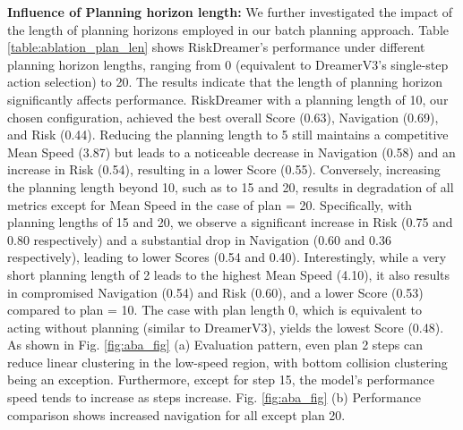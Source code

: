 \textbf{Influence of Planning horizon length:}
We further investigated the impact of the length of planning horizons employed in our batch planning approach. Table \ref{table:ablation_plan_len} shows RiskDreamer's performance under different planning horizon lengths, ranging from 0 (equivalent to DreamerV3's single-step action selection) to 20. The results indicate that the length of planning horizon significantly affects performance. RiskDreamer with a planning length of 10, our chosen configuration, achieved the best overall Score (0.63), Navigation (0.69), and Risk (0.44). Reducing the planning length to 5 still maintains a competitive Mean Speed (3.87) but leads to a noticeable decrease in Navigation (0.58) and an increase in Risk (0.54), resulting in a lower Score (0.55). Conversely, increasing the planning length beyond 10, such as to 15 and 20, results in degradation of all metrics except for Mean Speed in the case of plan = 20. Specifically, with planning lengths of 15 and 20, we observe a significant increase in Risk (0.75 and 0.80 respectively) and a substantial drop in Navigation (0.60 and 0.36 respectively), leading to lower Scores (0.54 and 0.40). Interestingly, while a very short planning length of 2 leads to the highest Mean Speed (4.10), it also results in compromised Navigation (0.54) and Risk (0.60), and a lower Score (0.53) compared to plan = 10. The case with plan length 0, which is equivalent to acting without planning (similar to DreamerV3), yields the lowest Score (0.48). As shown in Fig. \ref{fig:aba_fig} (a) Evaluation pattern, even plan 2 steps can reduce linear clustering in the low-speed region, with bottom collision clustering being an exception. Furthermore, except for step 15, the model's performance speed tends to increase as steps increase. Fig. \ref{fig:aba_fig} (b) Performance comparison shows increased navigation for all except plan 20.


